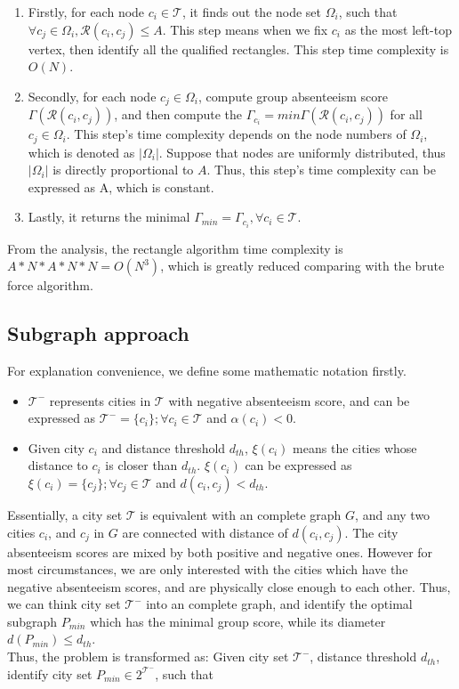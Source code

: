 \begin{enumerate}
  \item Firstly, for each node $c_i\in \mathcal{T}$, it finds out the node set $\Omega_i$, such that $\forall c_j \in \Omega_i, \mathcal{R}(c_i, c_j)\leq A$. This step means when we fix $c_i$ as the most left-top vertex, then identify all the qualified rectangles. This step time complexity is $O(N)$.
\item Secondly, for each node $c_j \in \Omega_i$, compute group absenteeism score $\Gamma(\mathcal{R}(c_i,c_j))$, and then compute the $\Gamma_{c_i}=min\Gamma(\mathcal{R}(c_i, c_j))$ for all $c_j\in \Omega_i$. This step's time complexity depends on the node numbers of $\Omega_i$, which is denoted as $|\Omega_i|$. Suppose that nodes are uniformly distributed, thus $|\Omega_i|$ is directly proportional to $A$. Thus, this step's time complexity can be expressed as A, which is constant.
  \item Lastly, it returns the minimal $\Gamma_{min}=\Gamma_{c_i}, \forall c_i\in \mathcal{T}$.
\end{enumerate}
From the analysis, the rectangle algorithm time complexity is $A*N*A*N*N = O(N^3)$, which is greatly reduced comparing with the brute force algorithm.




\subsection{Subgraph approach}
For explanation convenience, we define some mathematic notation firstly.
\begin{itemize}
 \item $\mathcal{T}^-$ represents cities in $\mathcal{T}$ with negative absenteeism score, and can be expressed as $\mathcal{T}^-=\{c_i\}; \forall c_i\in \mathcal{T}$ and $\alpha(c_i)< 0$.
    \item Given city $c_i$ and distance threshold $d_{th}$, $\xi(c_i)$ means the cities whose distance to $c_i$ is closer than $d_{th}$. $\xi(c_i)$ can be expressed as $\xi(c_i)=\{c_j\}; \forall c_j\in \mathcal{T}$ and $d(c_i,c_j)< d_{th}$.
\end{itemize}
Essentially, a city set $\mathcal{T}$ is equivalent with an complete graph $G$, and any two cities $c_i$, and $c_j$ in $G$ are connected with distance of $d(c_i,c_j)$. The city absenteeism scores are mixed by both positive and negative ones. However for most circumstances, we are only interested with the cities which have the negative absenteeism scores, and are physically close enough to each other. Thus, we can think city set $\mathcal{T}^-$ into an complete graph, and identify the optimal subgraph $P_{min}$ which has the minimal group score, while its diameter $d(P_{min})\leq d_{th}$.\\
Thus, the problem is transformed as: Given city set $\mathcal{T}^-$, distance threshold $d_{th}$, identify city set $P_{min}\in 2^\mathcal{T^-}$, such that

